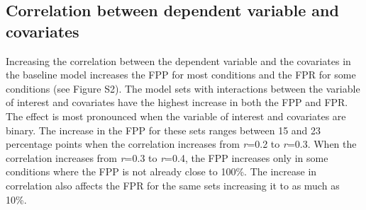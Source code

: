 \subsection{Correlation between dependent variable and covariates}
Increasing the correlation between the dependent variable and the covariates in the baseline model increases the FPP for most conditions and the FPR for some conditions (see Figure S2). The model sets with interactions between the variable of interest and covariates have the highest increase in both the FPP and FPR. The effect is most pronounced when the variable of interest and covariates are binary. The increase in the FPP for these sets ranges between 15 and 23 percentage points when the correlation increases from \textit{r}=0.2 to \textit{r}=0.3. When the correlation increases from \textit{r}=0.3 to \textit{r}=0.4, the FPP increases only in some conditions where the FPP is not already close to 100\%. The increase in correlation also affects the FPR for the same sets increasing it to as much as 10\%. 